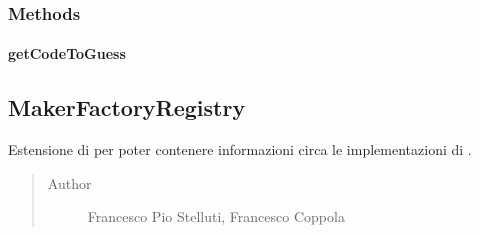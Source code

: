 \documentclass[letterpaper,10pt,italian]{sphinxmanual}
\begin{document}
\subsubsection{Methods}
\label{\detokenize{source/it/unicam/cs/pa/mastermind/players/InteractiveMaker:methods}}

\paragraph{getCodeToGuess}
\label{\detokenize{source/it/unicam/cs/pa/mastermind/players/InteractiveMaker:getcodetoguess}}

\begin{fulllineitems}
\label{\detokenize{source/it/unicam/cs/pa/mastermind/players/InteractiveMaker:it.unicam.cs.pa.mastermind.players.InteractiveMaker.getCodeToGuess(InteractionView)}}
\end{fulllineitems}



\subsection{MakerFactoryRegistry}
\label{\detokenize{source/it/unicam/cs/pa/mastermind/players/MakerFactoryRegistry:makerfactoryregistry}}\label{\detokenize{source/it/unicam/cs/pa/mastermind/players/MakerFactoryRegistry::doc}}

\begin{fulllineitems}
\label{\detokenize{source/it/unicam/cs/pa/mastermind/players/MakerFactoryRegistry:it.unicam.cs.pa.mastermind.players.MakerFactoryRegistry}}
Estensione di  per poter contenere informazioni circa le implementazioni di .
\begin{quote}\begin{description}
\item[{Author}] \leavevmode
Francesco Pio Stelluti, Francesco Coppola

\end{description}\end{quote}

\end{fulllineitems}
\end{document}
